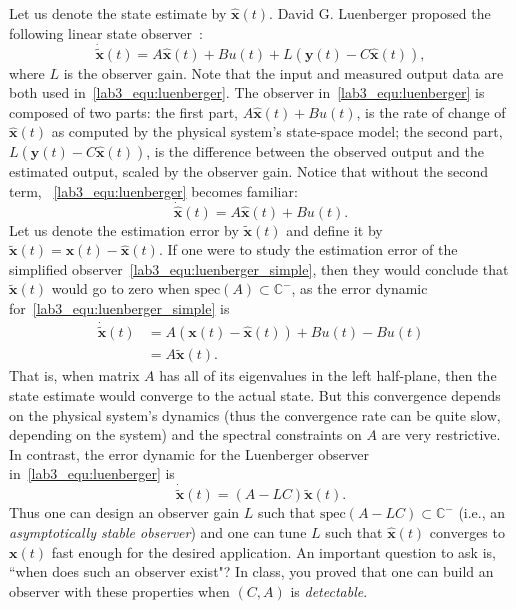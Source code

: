 Let us denote the state estimate by $\hat{\mathbf{x}}(t)$. David G. Luenberger proposed the following linear state observer~\cite{david1971introduction}:
\begin{equation}\label{lab3_equ:luenberger}
    \mathbf{\dot{\tilde{x}}}(t)=A\hat{\mathbf{x}}(t)+Bu(t)+L(\mathbf{y}(t)-C\hat{\mathbf{x}}(t)),
\end{equation}
where $L$ is the observer gain. Note that the input and measured output data are both used in~\eqref{lab3_equ:luenberger}. The observer in~\eqref{lab3_equ:luenberger} is composed of two parts: the first part, $A\hat{\mathbf{x}}(t)+Bu(t)$, is the rate of change of $\hat{\mathbf{x}}(t)$ as computed by the physical system's state-space model; the second part, $L(\mathbf{y}(t)-C\hat{\mathbf{x}}(t))$, is the difference between the observed output and the estimated output, scaled by the observer gain. Notice that without the second term, ~\eqref{lab3_equ:luenberger} becomes familiar:
\begin{equation}\label{lab3_equ:luenberger_simple}
    \mathbf{\dot{\hat{x}}}(t)=A\hat{\mathbf{x}}(t)+Bu(t).
\end{equation}
Let us denote the estimation error by $\tilde{\mathbf{x}}(t)$ and define it by $\tilde{\mathbf{x}}(t) = \mathbf{x}(t)-\hat{\mathbf{x}}(t)$. If one were to study the estimation error of the simplified observer~\eqref{lab3_equ:luenberger_simple}, then they would conclude that $\tilde{\mathbf{x}}(t)$ would go to zero when $\text{spec}(A) \subset \mathbb{C}^-$, as the error dynamic for~\eqref{lab3_equ:luenberger_simple} is
\begin{align*}
    \mathbf{\dot{\tilde{x}}}(t) & = A \left(\mathbf{x}(t)-\hat{\mathbf{x}}(t)\right)+Bu(t) - Bu(t) \\
                                & = A\tilde{\mathbf{x}}(t).
\end{align*}
That is, when matrix $A$ has all of its eigenvalues in the left half-plane, then the state estimate would converge to the actual state. But this convergence depends on the physical system's dynamics (thus the convergence rate can be quite slow, depending on the system) and the spectral constraints on $A$ are very restrictive. In contrast, the error dynamic for the Luenberger observer in~\eqref{lab3_equ:luenberger} is
\begin{equation}\label{lab3_equ:luenberger_error}
    \mathbf{\dot{\tilde{x}}}(t) = (A-LC) \tilde{\mathbf{x}}(t).
\end{equation}
Thus one can design an observer gain $L$ such that $\text{spec}(A-LC) \subset \mathbb{C}^-$ (i.e., an \emph{asymptotically stable observer}) and one can tune $L$ such that $\hat{\mathbf{x}}(t)$ converges to $\mathbf{x}(t)$ fast enough for the desired application. An important question to ask is, ``when does such an observer exist"? In class, you proved that one can build an observer with these properties when $(C,A)$ is \emph{detectable}.

